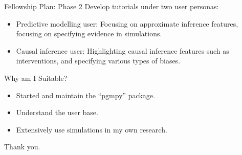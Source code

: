 \documentclass{beamer}
\begin{document}
\begin{frame}{Fellowship Plan: Phase 2}
	Develop tutorials under two user personas:

	\begin{itemize}
		\item Predictive modelling user: Focusing on approximate inference features, focusing on specifying evidence in simulations.
		\item Causal inference user: Highlighting causal inference features such as interventions, and specifying various types of biases.
	\end{itemize}
\end{frame}

\begin{frame}{Why am I Suitable?}
	\begin{itemize}
		\item Started and maintain the ``pgmpy'' package.
		\item Understand the user base. 
		\item Extensively use simulations in my own research.
	\end{itemize}
\end{frame}

\begin{frame}
	\huge{Thank you.}
\end{frame}
\end{document}
